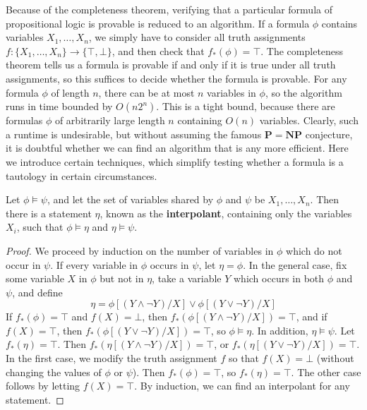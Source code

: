 Because of the completeness theorem, verifying that a particular formula of propositional logic is provable is reduced to an algorithm. If a formula $\phi$ contains variables $X_1, \dots, X_n$, we simply have to consider all truth assignments $f: \{ X_1, \dots, X_n \} \to \{ \top, \bot \}$, and then check that $f_*(\phi) = \top$. The completeness theorem tells us a formula is provable if and only if it is true under all truth assignments, so this suffices to decide whether the formula is provable. For any formula $\phi$ of length $n$, there can be at most $n$ variables in $\phi$, so the algorithm runs in time bounded by $O(n2^n)$. This is a tight bound, because there are formulas $\phi$ of arbitrarily large length $n$ containing $O(n)$ variables. Clearly, such a runtime is undesirable, but without assuming the famous $\mathbf{P} = \mathbf{NP}$ conjecture, it is doubtful whether we can find an algorithm that is any more efficient. Here we introduce certain techniques, which simplify testing whether a formula is a tautology in certain circumstances.

\begin{theorem}
    Let $\phi \vDash \psi$, and let the set of variables shared by $\phi$ and $\psi$ be $X_1, \dots, X_n$. Then there is a statement $\eta$, known as the {\bf interpolant}, containing only the variables $X_i$, such that $\phi \vDash \eta$ and $\eta \vDash \psi$.
\end{theorem}
\begin{proof}
    We proceed by induction on the number of variables in $\phi$ which do not occur in $\psi$. If every variable in $\phi$ occurs in $\psi$, let $\eta = \phi$. In the general case, fix some variable $X$ in $\phi$ but not in $\eta$, take a variable $Y$ which occurs in both $\phi$ and $\psi$, and define
    \[ \eta = \phi[(Y \wedge \neg Y)/X] \vee \phi[(Y \vee \neg Y)/X] \]
    If $f_*(\phi) = \top$ and $f(X) = \bot$, then $f_*(\phi[(Y \wedge \neg Y)/X]) = \top$, and if $f(X) = \top$, then $f_*(\phi[(Y \vee \neg Y)/X]) = \top$, so $\phi \vDash \eta$. In addition, $\eta \vDash \psi$. Let $f_*(\eta) = \top$. Then $f_*(\eta[(Y \wedge \neg Y)/X]) = \top$, or $f_*(\eta[(Y \vee \neg Y)/X]) = \top$. In the first case, we modify the truth assignment $f$ so that $f(X) = \bot$ (without changing the values of $\phi$ or $\psi$). Then $f_*(\phi) = \top$, so $f_*(\eta) = \top$. The other case follows by letting $f(X) = \top$. By induction, we can find an interpolant for any statement.
\end{proof}

